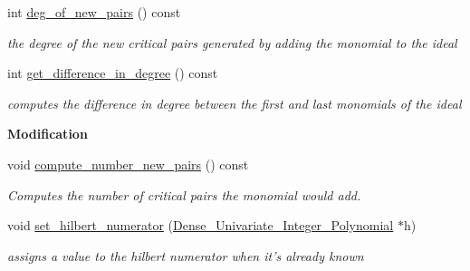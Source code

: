 \begin{Indent}
\begin{DoxyCompactItemize}
\mbox{\label{group___g_b_computation_a68c0ece8174abdb6d2955d63f04cd437}} 
int \hyperlink{group___g_b_computation_a68c0ece8174abdb6d2955d63f04cd437}{deg\+\_\+of\+\_\+new\+\_\+pairs} () const
\begin{DoxyCompactList}\small\item\em the degree of the new critical pairs generated by adding the monomial to the ideal \end{DoxyCompactList}\item 
\mbox{\label{group___g_b_computation_af9a60da2d124f45b884b93704b45cc45}} 
int \hyperlink{group___g_b_computation_af9a60da2d124f45b884b93704b45cc45}{get\+\_\+difference\+\_\+in\+\_\+degree} () const
\begin{DoxyCompactList}\small\item\em computes the difference in degree between the first and last monomials of the ideal \end{DoxyCompactList}\end{DoxyCompactItemize}
\end{Indent}
\begin{Indent}\textbf{ Modification}\par
\begin{DoxyCompactItemize}
\item 
\mbox{\label{group___g_b_computation_a8549c4626e69e8488078892f993a39c2}} 
void \hyperlink{group___g_b_computation_a8549c4626e69e8488078892f993a39c2}{compute\+\_\+number\+\_\+new\+\_\+pairs} () const
\begin{DoxyCompactList}\small\item\em Computes the number of critical pairs the monomial would add. \end{DoxyCompactList}\item 
\mbox{\label{group___g_b_computation_a20bb441439236bcce2d9e87b8486553f}} 
void \hyperlink{group___g_b_computation_a20bb441439236bcce2d9e87b8486553f}{set\+\_\+hilbert\+\_\+numerator} (\hyperlink{group__polygroup_class_dense___univariate___integer___polynomial}{Dense\+\_\+\+Univariate\+\_\+\+Integer\+\_\+\+Polynomial} $\ast$h)
\begin{DoxyCompactList}\small\item\em assigns a value to the hilbert numerator when it's already known \end{DoxyCompactList}\end{DoxyCompactItemize}
\end{Indent}
